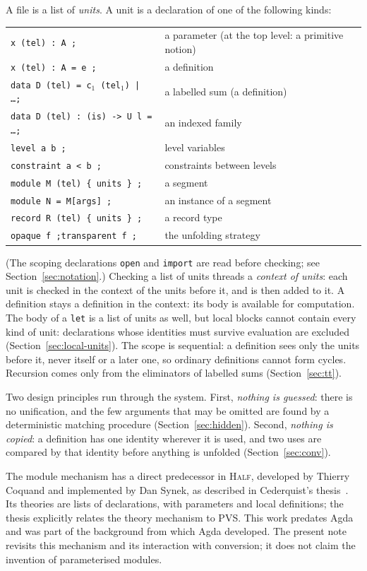 \documentclass[11pt]{article}
\newcommand{\kw}[1]{\texttt{#1}}
\theoremstyle{remark}
\begin{document}
A file is a list of \emph{units}. A unit is a declaration of one of the
following kinds:
\begin{center}
\begin{tabular}{ll}
\kw{x (tel) : A ;} & a parameter (at the top level: a primitive notion)\\
\kw{x (tel) : A = e ;} & a definition\\
\kw{data D (tel) = c$_1$ (tel$_1$) | \dots ;} & a labelled sum (a definition)\\
\kw{data D (tel) : (is) -> U l = \dots ;} & an indexed family\\
\kw{level a b ;} & level variables\\
\kw{constraint a < b ;} & constraints between levels\\
\kw{module M (tel) \{ units \} ;} & a segment\\
\kw{module N = M[args] ;} & an instance of a segment\\
\kw{record R (tel) \{ units \} ;} & a record type\\
\kw{opaque f ;}\quad\kw{transparent f ;} & the unfolding strategy
\end{tabular}
\end{center}
(The scoping declarations \kw{open} and \kw{import} are read before
checking; see Section~\ref{sec:notation}.)
Checking a list of units threads a \emph{context of units}: each unit is
checked in the context of the units before it, and is then added to it.
A definition stays a definition in the context: its body is available for
computation. The body of a \kw{let} is a list of units as
well, but local blocks cannot contain every kind of unit: declarations
whose identities must survive evaluation are excluded
(Section~\ref{sec:local-units}). The scope is sequential: a definition sees only the units before
it, never itself or a later one, so ordinary definitions cannot form
cycles. Recursion comes only from the eliminators of labelled sums
(Section~\ref{sec:tt}).

Two design principles run through the system. First, \emph{nothing is
guessed}: there is no unification, and the few arguments that may be
omitted are found by a deterministic matching procedure
(Section~\ref{sec:hidden}). Second, \emph{nothing is copied}: a
definition has one identity wherever it is used, and two uses are
compared by that identity before anything is unfolded
(Section~\ref{sec:conv}).

The module mechanism has a direct predecessor in \textsc{Half}, developed
by Thierry Coquand and implemented by Dan Synek, as described in
Cederquist's thesis~\cite{Ced}. Its theories are lists of declarations,
with parameters and local definitions; the thesis explicitly relates the
theory mechanism to PVS. This work predates Agda and was part of the
background from which Agda developed. The present note revisits this
mechanism and its interaction with conversion; it does not claim the
invention of parameterised modules.
\end{document}
